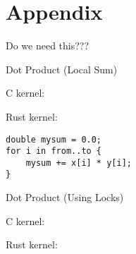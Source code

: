 \section{Appendix}\label{sec::appendix}

Do we need this???

Dot Product (Local Sum)

C kernel:

Rust kernel:

\begin{lstlisting}[caption={Matrix Multiply Rust kernel}]
double mysum = 0.0;
for i in from..to {
	mysum += x[i] * y[i];
}
\end{lstlisting}


Dot Product (Using Locks)

C kernel:

Rust kernel: